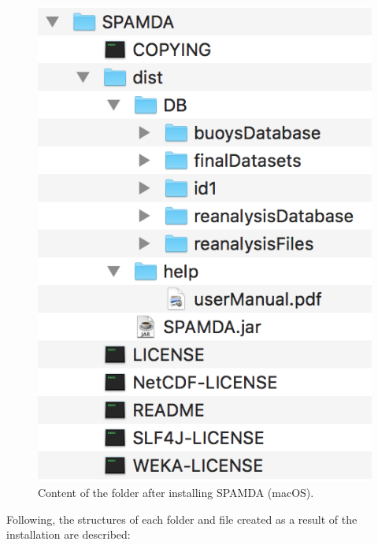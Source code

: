 \begin{onehalfspace}
				\begin{figure}[ht!]
					\centering
					\includegraphics[scale=0.60]{figures/installationOnMacOS.png}
					\caption{Content of the folder after installing SPAMDA (macOS).}
					\label{fig:installationOnMacOS}
				\end{figure}
				
				Following, the structures of each folder and file created as a result of the installation are described:
				

\end{onehalfspace}
